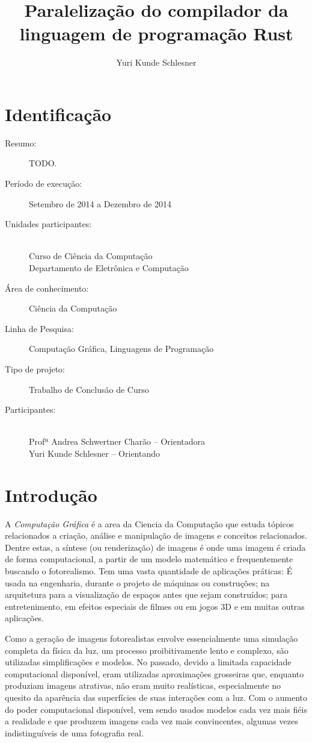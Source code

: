 \documentclass[12pt]{article}
\title{Paralelização do compilador da linguagem de programação Rust}
\author{Yuri Kunde Schlesner}
\newcommand{\todo}[1]{\textsf{\color{red}#1}}
\begin{document}
\maketitle

\section{Identificação}

\begin{description}
	\item[Resumo:] \todo{TODO.}
	\item[Período de execução:] Setembro de 2014 a Dezembro de 2014
	\item[Unidades participantes:] ~\\ Curso de Ciência da Computação \\ Departamento de Eletrônica e Computação
	\item[Área de conhecimento:] Ciência da Computação
	\item[Linha de Pesquisa:] Computação Gráfica, Linguagens de Programação
	\item[Tipo de projeto:] Trabalho de Conclusão de Curso
	\item[Participantes:] ~\\ Profª Andrea Schwertner Charão -- Orientadora \\ Yuri Kunde Schlesner -- Orientando
\end{description}

\section{Introdução}

A \emph{Computação Gráfica} é a area da Ciencia da Computação que estuda tópicos relacionados a criação, análise e manipulação de imagens e conceitos relacionados. Dentre estas, a síntese (ou renderização) de imagens é onde uma imagem é criada de forma computacional, a partir de um modelo matemático e frequentemente buscando o fotorealismo. Tem uma vasta quantidade de aplicações práticas: É usada na engenharia, durante o projeto de máquinas ou construções; na arquitetura para a visualização de espaços antes que sejam construídos; para entretenimento, em efeitos especiais de filmes ou em jogos 3D e em muitas outras aplicações.

Como a geração de imagens fotorealistas envolve essencialmente uma simulação completa da física da luz, um processo proibitivamente lento e complexo, são utilizadas simplificações e modelos. No passado, devido a limitada capacidade computacional disponível, eram utilizadas aproximações grosseiras que, enquanto produziam imagens atrativas, não eram muito realísticas, especialmente no quesito da aparência das superfícies de suas interações com a luz. Com o aumento do poder computacional disponível, vem sendo usados modelos cada vez mais fiéis a realidade e que produzem imagens cada vez mais convincentes, algumas vezes indistinguíveis de uma fotografia real.
\end{document}
